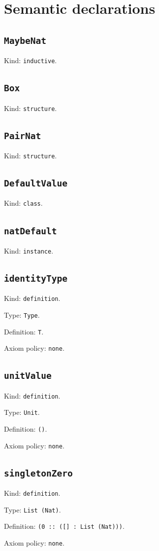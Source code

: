 \documentclass[11pt]{article}
\begin{document}
\section*{Semantic declarations}
\subsection*{\texttt{MaybeNat}}
\noindent Kind: \texttt{inductive}.\par
\subsection*{\texttt{Box}}
\noindent Kind: \texttt{structure}.\par
\subsection*{\texttt{PairNat}}
\noindent Kind: \texttt{structure}.\par
\subsection*{\texttt{DefaultValue}}
\noindent Kind: \texttt{class}.\par
\subsection*{\texttt{natDefault}}
\noindent Kind: \texttt{instance}.\par
\subsection*{\texttt{identityType}}
\noindent Kind: \texttt{definition}.\par
\noindent Type: \texttt{Type}.\par
\noindent Definition: \texttt{T}.\par
\noindent Axiom policy: \texttt{none}.\par
\subsection*{\texttt{unitValue}}
\noindent Kind: \texttt{definition}.\par
\noindent Type: \texttt{Unit}.\par
\noindent Definition: \texttt{()}.\par
\noindent Axiom policy: \texttt{none}.\par
\subsection*{\texttt{singletonZero}}
\noindent Kind: \texttt{definition}.\par
\noindent Type: \texttt{List (Nat)}.\par
\noindent Definition: \texttt{(0 :: ([] : List (Nat)))}.\par
\noindent Axiom policy: \texttt{none}.\par
\end{document}
